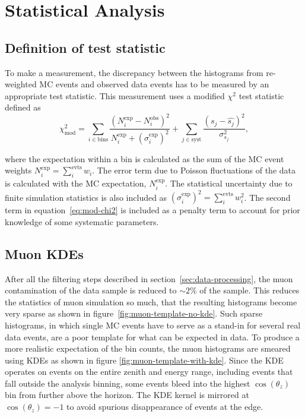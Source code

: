 \section{Statistical Analysis}

\subsection{Definition of test statistic}
\label{sec:test-statistic}

To make a measurement, the discrepancy between the histograms from re-weighted MC events and observed data events has to be measured by an appropriate test statistic.
This measurement uses a modified $\chi^2$ test statistic defined as
\begin{equation}
\chi^2_{\mathrm{mod}} = \sum_{i \in \mathrm{bins}}^{}\frac{(N^{\mathrm{exp}}_i - N^{\mathrm{obs}}_i)^2}{N^{\mathrm{exp}}_i + (\sigma^{\mathrm{exp}}_i)^2} + \sum_{j \in \mathrm{syst}}^{}\frac{(s_j - \hat{s_j})^2}{\sigma^2_{s_j}},
\label{eq:mod-chi2}
\end{equation}

\noindent where the expectation within a bin is calculated as the sum of the MC event weights $N^{\mathrm{exp}}_i = \sum_{i}^{\mathrm{evts}} w_i$. The error term due to Poisson fluctuations of the data is calculated with the MC expectation, $N^{\mathrm{exp}}_i$. The statistical uncertainty due to finite simulation statistics is also included as $(\sigma^{\mathrm{exp}}_i)^2 = \sum_{i}^{\mathrm{evts}} w_i^2$.
The second term in equation~\ref{eq:mod-chi2} is included as a penalty term to account for prior knowledge of some systematic parameters.


\subsection{Muon KDEs}
\label{section:muon_kde}

After all the filtering steps described in section~\ref{sec:data-processing}, the muon contamination of the data sample is reduced to $\sim 2\%$ of the sample.
This reduces the statistics of muon simulation so much, that the resulting histograms become very sparse as shown in figure~\ref{fig:muon-template-no-kde}.
Such sparse histograms, in which single MC events have to serve as a stand-in for several real data events, are a poor template for what can be expected in data.
To produce a more realistic expectation of the bin counts, the muon histograms are smeared using KDEs as shown in figure \ref{fig:muon-template-with-kde}.
Since the KDE operates on events on the entire zenith and energy range, including events that fall outside the analysis binning, some events bleed into the highest $\cos(\theta_z)$ bin from further above the horizon.
The KDE kernel is mirrored at $\cos(\theta_z) = -1$ to avoid spurious disappearance of events at the edge.

